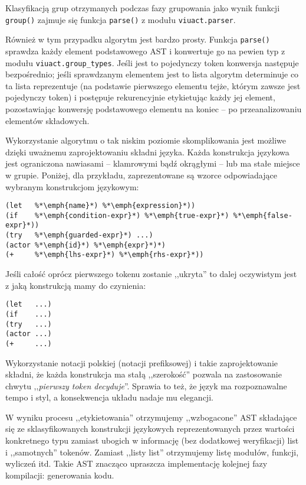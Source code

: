 Klasyfikacją grup otrzymanych podczas fazy grupowania jako wynik funkcji
\texttt{group()} zajmuje się funkcja \texttt{parse()} z modułu \texttt{viuact.parser}.

Również w tym przypadku algorytm jest bardzo prosty. Funkcja \texttt{parse()}
sprawdza każdy element podstawowego AST i konwertuje go na pewien typ z modułu
\texttt{viuact.group\_types}. Jeśli jest to pojedynczy token konwersja następuje
bezpośrednio; jeśli sprawdzanym elementem jest to lista algorytm determinuje co
ta lista reprezentuje (na podstawie pierwszego elementu tejże, którym zawsze
jest pojedynczy token) i postępuje rekurencyjnie etykietując każdy jej element,
pozostawiając konwersję podstawowego elementu na koniec -- po przeanalizowaniu
elementów składowych.

Wykorzystanie algorytmu o tak niskim poziomie skomplikowania jest możliwe dzięki
uważnemu zaprojektowaniu składni języka. Każda konstrukcja językowa jest
ograniczona nawiasami -- klamrowymi bądź okrągłymi -- lub ma stałe miejsce w
grupie. Poniżej, dla przykładu, zaprezentowane są wzorce odpowiadające wybranym
konstrukcjom językowym:

\begin{lstlisting}
(let   %*\emph{name}*) %*\emph{expression}*))
(if    %*\emph{condition-expr}*) %*\emph{true-expr}*) %*\emph{false-expr}*))
(try   %*\emph{guarded-expr}*) ...)
(actor %*\emph{id}*) %*\emph{expr}*)*)
(+     %*\emph{lhs-expr}*) %*\emph{rhs-expr}*))
\end{lstlisting}

Jeśli całość oprócz pierwszego tokenu zostanie ,,ukryta'' to dalej oczywistym
jest z jaką konstrukcją mamy do czynienia:

\begin{lstlisting}
(let   ...)
(if    ...)
(try   ...)
(actor ...)
(+     ...)
\end{lstlisting}

Wykorzystanie notacji polskiej (notacji prefiksowej) i takie zaprojektowanie
składni, że każda konstrukcja ma stałą ,,szerokość'' pozwala na zastosowanie
chwytu ,,\emph{pierwszy token decyduje}''. Sprawia to też, że język ma
rozpoznawalne tempo i styl, a konsekwencja układu nadaje mu elegancji.

\vspace{1em}

W wyniku procesu ,,etykietowania'' otrzymujemy ,,wzbogacone'' AST składające się
ze sklasyfikowanych konstrukcji językowych reprezentowanych przez wartości
konkretnego typu zamiast ubogich w informację (bez dodatkowej weryfikacji) list
i ,,samotnych'' tokenów. Zamiast ,,listy list'' otrzymujemy listę modułów,
funkcji, wyliczeń itd. Takie AST znacząco upraszcza implementację kolejnej fazy
kompilacji: generowania kodu.

